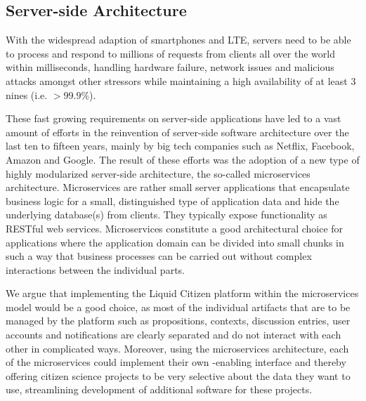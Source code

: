 \subsection{Server-side Architecture}
\label{ssec:ServerSideArchitecture}

With the widespread adaption of smartphones and LTE, servers need to be able to process and respond to millions of requests from clients all over the world within milliseconds, handling hardware failure, network issues and malicious attacks amongst other stressors while maintaining a high availability of at least 3 nines (i.e. $>99.9\% $).

These fast growing requirements on server-side applications have led to a vast amount of efforts in the reinvention of server-side software architecture over the last ten to fifteen years, mainly by big tech companies such as Netflix, Facebook, Amazon and Google.
The result of these efforts was the adoption of a new type of highly modularized server-side architecture, the so-called microservices architecture.
Microservices are rather small server applications that encapsulate business logic for a small, distinguished type of application data and hide the underlying database(s) from clients.
They typically expose functionality as RESTful web services.
Microservices constitute a good architectural choice for applications where the application domain can be divided into small chunks in such a way that business processes can be carried out without complex interactions between the individual parts.

We argue that implementing the Liquid Citizen platform within the microservices model would be a good choice, as most of the individual artifacts that are to be managed by the platform such as propositions, contexts, discussion entries, user accounts and notifications are clearly separated and do not interact with each other in complicated ways.
Moreover, using the microservices architecture, each of the microservices could implement their own -enabling interface and thereby offering citizen science projects to be very selective about the data they want to use, streamlining development of additional software for these projects.

%



